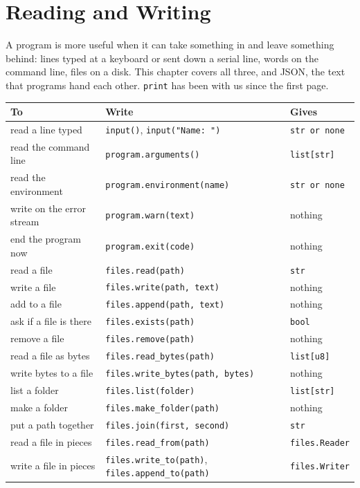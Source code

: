 \chapter{Reading and Writing}\label{ch-reading-writing}

A program is more useful when it can take something in and leave
something behind: lines typed at a keyboard or sent down a serial
line, words on the command line, files on a disk. This chapter covers
all three, and JSON, the text that programs hand each other. \verb|print| has been with us since the first page.

\begin{center}
\begin{tabular}{lll}
\toprule
To & Write & Gives \\
\midrule
read a line typed & \verb|input()|, \verb|input("Name: ")| & \verb|str or none| \\
read the command line & \verb|program.arguments()| & \verb|list[str]| \\
read the environment & \verb|program.environment(name)| & \verb|str or none| \\
write on the error stream & \verb|program.warn(text)| & nothing \\
end the program now & \verb|program.exit(code)| & nothing \\
read a file & \verb|files.read(path)| & \verb|str| \\
write a file & \verb|files.write(path, text)| & nothing \\
add to a file & \verb|files.append(path, text)| & nothing \\
ask if a file is there & \verb|files.exists(path)| & \verb|bool| \\
remove a file & \verb|files.remove(path)| & nothing \\
read a file as bytes & \verb|files.read_bytes(path)| & \verb|list[u8]| \\
write bytes to a file & \verb|files.write_bytes(path, bytes)| & nothing \\
list a folder & \verb|files.list(folder)| & \verb|list[str]| \\
make a folder & \verb|files.make_folder(path)| & nothing \\
put a path together & \verb|files.join(first, second)| & \verb|str| \\
read a file in pieces & \verb|files.read_from(path)| & \verb|files.Reader| \\
write a file in pieces & \verb|files.write_to(path)|, \verb|files.append_to(path)| & \verb|files.Writer| \\
\bottomrule
\end{tabular}
\end{center}

